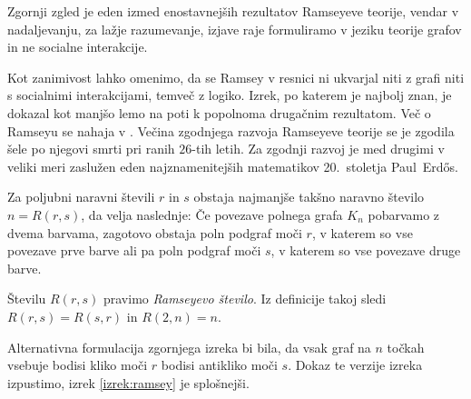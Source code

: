 \documentclass[twoside,11pt]{article}
\begin{document}
Zgornji zgled je eden izmed enostavnejših rezultatov Ramseyeve teorije, vendar v nadaljevanju,
za lažje razumevanje, izjave raje formuliramo v jeziku teorije grafov in ne socialne interakcije.

Kot zanimivost lahko omenimo, da se Ramsey v 
resnici ni ukvarjal niti z grafi niti s socialnimi interakcijami, temveč z logiko. Izrek, po katerem 
je najbolj znan, je dokazal kot manjšo lemo na poti k popolnoma drugačnim rezultatom. Več 
o Ramseyu se nahaja v \cite[poglavje 30]{color}. Večina zgodnjega razvoja 
Ramseyeve teorije se je zgodila šele po njegovi smrti pri ranih $26$-tih letih. Za zgodnji razvoj je 
med drugimi v veliki meri zaslužen eden najznamenitejših matematikov 20.~stoletja 
Paul~Erdős.

\begin{izrek}[Ramsey]
    Za poljubni naravni števili $r$ in $s$ obstaja najmanjše takšno naravno število 
    $n = R(r,s)$, da velja naslednje: Če povezave polnega grafa $K_n$ pobarvamo z dvema barvama, 
    zagotovo obstaja poln podgraf moči $r$, v katerem so vse povezave prve barve ali pa poln 
    podgraf moči $s$, v katerem so vse povezave druge barve.
\end{izrek}

Številu $R(r, s)$ pravimo \emph{Ramseyevo število}.
Iz definicije takoj sledi $R(r, s) = R(s, r)$ in $R(2, n) = n$.


Alternativna formulacija zgornjega izreka bi bila, da vsak graf na $n$ točkah vsebuje 
bodisi kliko moči $r$ bodisi antikliko moči $s$.
Dokaz te verzije izreka izpustimo, izrek \ref{izrek:ramsey} je splošnejši.
\end{document}

